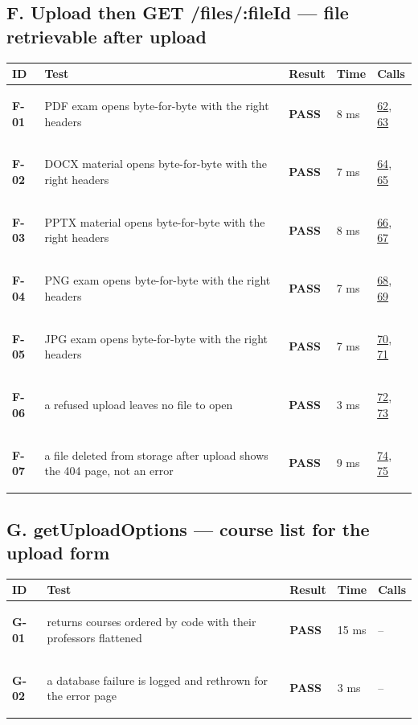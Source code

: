 \documentclass[10pt,a4paper]{article}
\begin{document}
\subsection*{F. Upload then GET /files/:fileId — file retrievable after upload}
\begin{longtable}{@{}P{1.2cm}P{9.2cm}P{1.2cm}P{1.3cm}P{2.4cm}@{}}
\toprule \textbf{ID} & \textbf{Test} & \textbf{Result} & \textbf{Time} & \textbf{Calls} \\ \midrule \endhead
\hypertarget{test-F-01}{\textbf{F-01}} & PDF exam opens byte-for-byte with the right headers & \textcolor{passgreen}{\textbf{PASS}} & 8 ms & \hyperlink{call62}{62}, \hyperlink{call63}{63} \\
\hypertarget{test-F-02}{\textbf{F-02}} & DOCX material opens byte-for-byte with the right headers & \textcolor{passgreen}{\textbf{PASS}} & 7 ms & \hyperlink{call64}{64}, \hyperlink{call65}{65} \\
\hypertarget{test-F-03}{\textbf{F-03}} & PPTX material opens byte-for-byte with the right headers & \textcolor{passgreen}{\textbf{PASS}} & 8 ms & \hyperlink{call66}{66}, \hyperlink{call67}{67} \\
\hypertarget{test-F-04}{\textbf{F-04}} & PNG exam opens byte-for-byte with the right headers & \textcolor{passgreen}{\textbf{PASS}} & 7 ms & \hyperlink{call68}{68}, \hyperlink{call69}{69} \\
\hypertarget{test-F-05}{\textbf{F-05}} & JPG exam opens byte-for-byte with the right headers & \textcolor{passgreen}{\textbf{PASS}} & 7 ms & \hyperlink{call70}{70}, \hyperlink{call71}{71} \\
\hypertarget{test-F-06}{\textbf{F-06}} & a refused upload leaves no file to open & \textcolor{passgreen}{\textbf{PASS}} & 3 ms & \hyperlink{call72}{72}, \hyperlink{call73}{73} \\
\hypertarget{test-F-07}{\textbf{F-07}} & a file deleted from storage after upload shows the 404 page, not an error & \textcolor{passgreen}{\textbf{PASS}} & 9 ms & \hyperlink{call74}{74}, \hyperlink{call75}{75} \\
\bottomrule
\end{longtable}

\subsection*{G. getUploadOptions — course list for the upload form}
\begin{longtable}{@{}P{1.2cm}P{9.2cm}P{1.2cm}P{1.3cm}P{2.4cm}@{}}
\toprule \textbf{ID} & \textbf{Test} & \textbf{Result} & \textbf{Time} & \textbf{Calls} \\ \midrule \endhead
\hypertarget{test-G-01}{\textbf{G-01}} & returns courses ordered by code with their professors flattened & \textcolor{passgreen}{\textbf{PASS}} & 15 ms & -- \\
\hypertarget{test-G-02}{\textbf{G-02}} & a database failure is logged and rethrown for the error page & \textcolor{passgreen}{\textbf{PASS}} & 3 ms & -- \\
\bottomrule
\end{longtable}
\end{document}
